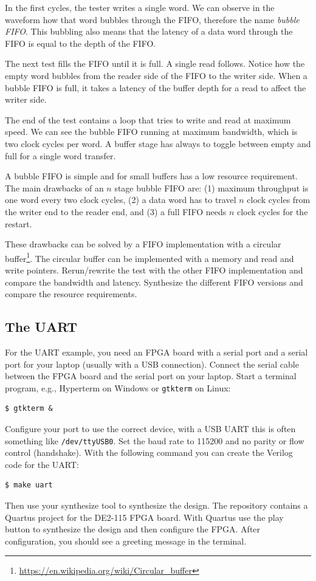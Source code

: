 \documentclass[%
    10pt,
    headinclude, footexclude,
    openright, %
    notitlepage,
    cleardoubleempty,
    headsepline,
    pointlessnumbers,
    bibtotoc, idxtotoc,
    ]{scrbook}
\newcommand{\code}[1]{{\lstinline[basicstyle=\small\ttfamily]{#1}}}
\newcommand{\myref}[2]{\href{#1}{#2}}
\renewcommand{\myref}[2]{{#2}{\footnote{\url{#1}}}}
\begin{document}
In the first cycles, the tester writes a single word. We can observe in
the waveform how that word bubbles through the FIFO, therefore the
name \emph{bubble FIFO}. This bubbling also means that the
latency of a data word through the FIFO is equal to the depth of the FIFO.

The next test fills the FIFO until it is full. A single read follows.
Notice how the empty word bubbles from the reader side of the FIFO
to the writer side. When a bubble FIFO is full, it takes
a latency of the buffer depth for a read to affect the writer side.

The end of the test contains a loop that tries to write and read at maximum speed.
We can see the bubble FIFO running at maximum bandwidth, which is two
clock cycles per word. A buffer stage has always to toggle between empty
and full for a single word transfer.

A bubble FIFO is simple and for small buffers has a low resource requirement.
The main drawbacks of an $n$ stage bubble FIFO are: (1) maximum throughput is
one word every two clock cycles, (2) a data word has to travel $n$ clock cycles
from the writer end to the reader end, and (3) a full FIFO needs $n$ clock cycles
for the restart.

These drawbacks can be solved by a FIFO implementation with a
\myref{https://en.wikipedia.org/wiki/Circular_buffer}{circular buffer}.
The circular buffer can be implemented with a memory and
read and write pointers.
Rerun/rewrite the test with the other FIFO implementation and compare
the bandwidth and latency. Synthesize the different FIFO versions and compare
the resource requirements.

\subsection{The UART}

For the UART example, you need an FPGA board with a serial port and
a serial port for your laptop (usually with a USB connection).
Connect the serial cable between the FPGA board and the serial port on
your laptop. Start a terminal program, e.g., Hyperterm on Windows
or \code{gtkterm} on Linux:
\begin{verbatim}
$ gtkterm &
\end{verbatim}
Configure your port to use the correct device, with a USB UART this
is often something like \code{/dev/ttyUSB0}. Set the baud rate to 115200
and no parity or flow control (handshake).
With the following command you can create the Verilog code for the UART:
\begin{verbatim}
$ make uart
\end{verbatim}
Then use your synthesize tool to synthesize the design.
The repository contains a Quartus project for the DE2-115 FPGA board.
With Quartus use the play button to synthesize the design and then configure
the FPGA.
After configuration, you should see a greeting message in the terminal.
\end{document}

